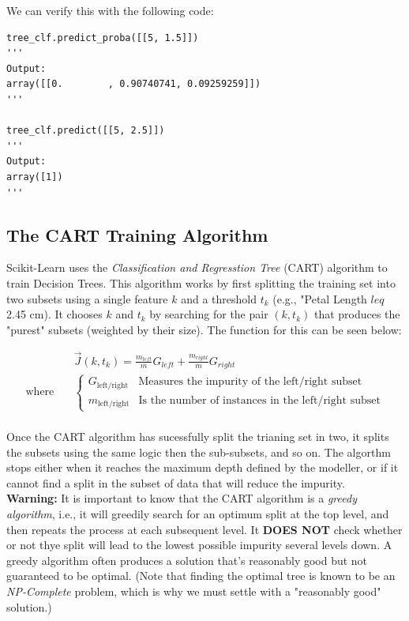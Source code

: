 \noindent
We can verify this with the following code:

\begin{verbatim}
tree_clf.predict_proba([[5, 1.5]])
'''
Output:
array([[0.        , 0.90740741, 0.09259259]])
'''

tree_clf.predict([[5, 2.5]])
'''
Output:
array([1])
'''    
\end{verbatim}

\subsection{The CART Training Algorithm}

Scikit-Learn uses the \textit{Classification and Regresstion Tree} (CART) algorithm to train Decision Trees. This algorithm works by 
first splitting the training set into two subsets using a single feature $k$ and a threshold $t_{k}$ (e.g., "Petal Length $leq$ 2.45 cm).
It chooses $k$ and $t_{k}$ by searching for the pair $(k, t_{k})$ that produces the "purest" subsets (weighted by their size). The function
for this can be seen below:

\[
\begin{aligned}
 \quad & \vec{J}(k, t_{k}) = \frac{m_{left}}{m} G_{left} + \frac{m_{right}}{m} G_{right}\\
\textrm{where} \quad & 
\begin{cases} 
    G_{\text{left/right}} & \text{Measures the impurity of the left/right subset} \\
    m_{\text{left/right}} & \text{Is the number of instances in the left/right subset}
\end{cases}
\end{aligned}
\] \\

\noindent
Once the CART algorithm has sucessfully split the trianing set in two, it splits the subsets using the same logic then the sub-subsets, 
and so on. The algorthm stops either when it reaches the maximum depth defined by the modeller, or if it cannot find a split in the 
subset of data that will reduce the impurity. \\

\noindent
\textbf{Warning:} It is important to know that the CART algorithm is a \textit{greedy algorithm}, i.e., it will greedily search for an
optimum split at the top level, and then repeats the process at each subsequent level. It \textbf{DOES NOT} check whether or not thye 
split will lead to the lowest possible impurity several levels down. A greedy algorithm often produces a solution that's reasonably good 
but not guaranteed to be optimal. (Note that finding the optimal tree is known to be an \textit{NP-Complete} problem, which is why we 
must settle with a "reasonably good" solution.)

